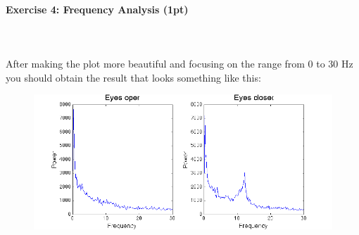 \documentclass[a4paper,11pt]{article}
\newenvironment{exercise}[3]{\paragraph{Exercise #1: #2 (#3pt)}\ \\}{
\medskip}
\begin{document}
\begin{exercise}{4}{Frequency Analysis}{1}
\ \\
After making the plot more beautiful and focusing on the range from 0 to 30 Hz you should obtain the result that looks something like this:
\begin{figure}[H]
   \centering
   \includegraphics[width=1\textwidth]{fouriereyes.png} 
\end{figure}
\end{exercise}
\end{document}
